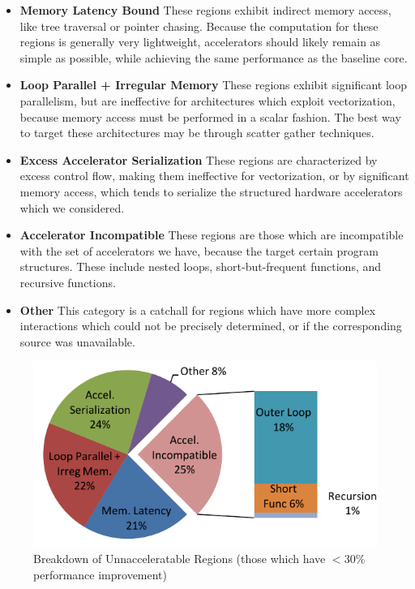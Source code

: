 \begin{itemize}[itemsep=0.5pt, topsep=8pt, partopsep=0pt]
  \item \textbf{Memory Latency Bound} These regions exhibit indirect memory access,
like tree traversal or pointer chasing.  Because the computation for these regions is
generally very lightweight, accelerators should likely remain as simple as possible, while
achieving the same performance as the baseline core.
  \item \textbf{Loop Parallel + Irregular Memory} These regions exhibit significant loop 
parallelism, but are ineffective for architectures which exploit vectorization, because
memory access must be performed in a scalar fashion.  The best way to target these architectures may be through scatter gather techniques. 
  \item \textbf{Excess Accelerator Serialization} These regions are characterized by
excess control flow, making them ineffective for vectorization, or by significant
memory access, which tends to serialize the structured hardware accelerators which
we considered.  
  \item \textbf{Accelerator Incompatible}  These regions are those which are incompatible
with the set of accelerators we have, because the target certain program structures.
These include nested loops, short-but-frequent functions, and recursive functions.
  \item \textbf{Other}  This category is a catchall for regions which have more complex
interactions which could not be precisely determined, or if the corresponding
 source was unavailable.
\end{itemize}

\begin{figure}
  \begin{center}
    \includegraphics[width=0.55\linewidth]{figs/unacceleratable_regions.pdf}
  \end{center}
\vspace{-0.2in}
  \caption{Breakdown of Unnacceleratable Regions (those which have $<30\%$ performance improvement)}
  \label{fig:unacc}
\vspace{-0.05in}
\end{figure}

